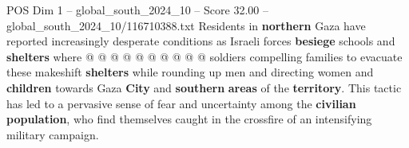 \begin{textsample}{POS Dim 1 – global\_south\_2024\_10 – Score 32.00 – global\_south\_2024\_10/116710388.txt}
Residents in \textbf{northern} Gaza have reported increasingly desperate conditions as Israeli forces \textbf{besiege} schools and \textbf{shelters} where @ @ @ @ @ @ @ @ @ @ soldiers compelling families to evacuate these makeshift \textbf{shelters} while rounding up men and directing women and \textbf{children} towards Gaza \textbf{City} and \textbf{southern} \textbf{areas} of the \textbf{territory}.
This tactic has led to a pervasive sense of fear and uncertainty among the \textbf{civilian} \textbf{population}, who find themselves caught in the crossfire of an intensifying military campaign.

\end{textsample}
